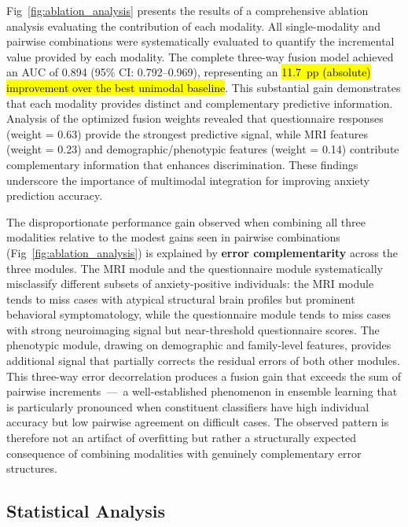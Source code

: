 \documentclass[10pt,letterpaper]{article}
\newcommand{\hlpar}[1]{\leavevmode\colorbox{yellow!30}{\parbox{\dimexpr\linewidth-2\fboxsep\relax}{#1}}\vspace{2pt}}
\begin{document}
                                                                                                                          Fig~\ref{fig:ablation_analysis} presents the results of a comprehensive ablation analysis evaluating the contribution of each modality. All single-modality and pairwise combinations were systematically evaluated to quantify the incremental value provided by each modality. The complete three-way fusion model achieved an AUC of 0.894 (95\% CI: 0.792--0.969), representing an \hl{11.7~pp (absolute) improvement over the best unimodal baseline}. This substantial gain demonstrates that each modality provides distinct and complementary predictive information. Analysis of the optimized fusion weights revealed that questionnaire responses (weight = 0.63) provide the strongest predictive signal, while MRI features (weight = 0.23) and demographic/phenotypic features (weight = 0.14) contribute complementary information that enhances discrimination. These findings underscore the importance of multimodal integration for improving anxiety prediction accuracy.

\hlpar{The disproportionate performance gain observed when combining all three modalities relative to the modest gains seen in pairwise combinations (Fig~\ref{fig:ablation_analysis}) is explained by \textbf{error complementarity} across the three modules. The MRI module and the questionnaire module systematically misclassify different subsets of anxiety-positive individuals: the MRI module tends to miss cases with atypical structural brain profiles but prominent behavioral symptomatology, while the questionnaire module tends to miss cases with strong neuroimaging signal but near-threshold questionnaire scores. The phenotypic module, drawing on demographic and family-level features, provides additional signal that partially corrects the residual errors of both other modules. This three-way error decorrelation produces a fusion gain that exceeds the sum of pairwise increments~---~a well-established phenomenon in ensemble learning \cite{ref63} that is particularly pronounced when constituent classifiers have high individual accuracy but low pairwise agreement on difficult cases. The observed pattern is therefore not an artifact of overfitting but rather a structurally expected consequence of combining modalities with genuinely complementary error structures.}


                                                                                                                          \subsection*{Statistical Analysis}
\end{document}
